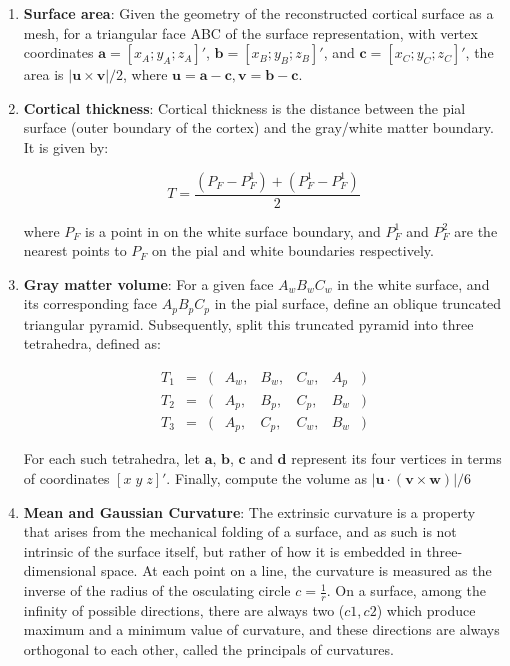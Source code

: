 \documentclass{cys}
\begin{document}
\begin{enumerate}


\item \textbf{Surface area}: Given the geometry of the reconstructed cortical surface as a mesh, for a triangular face ABC of the surface representation, with vertex coordinates $\mathbf{a}=[x_A ; y_A ; z_A]'$, $\mathbf{b}=[x_B ; y_B ; z_B]'$, and $\mathbf{c}=[x_C ; y_C ; z_C]'$, the area is $|\mathbf{u} \times \mathbf{v}|/2$, where $\mathbf{u} = \mathbf{a}-\mathbf{c}, \mathbf{v} = \mathbf{b}-\mathbf{c}$.

\item \textbf{Cortical thickness}: Cortical thickness is the distance between the pial surface (outer boundary of the cortex) and the gray/white matter boundary. It is given by: 

\begin{equation}
T=\frac{(P_F-P_F^1)+(P_F^1-P_F^1)}{2}
\end{equation}

where $P_F$ is a point in on the white surface boundary, and $P_F^1$ and $P_F^2$ are the nearest points to $P_F$ on the pial and white boundaries respectively. 

\item \textbf{Gray matter volume}: For a given face $A_w B_w C_w$ in the white surface, and its corresponding face $A_p B_p C_p$ in the pial surface, define an oblique truncated triangular pyramid. Subsequently, split this truncated pyramid into three tetrahedra, defined as:

\[
\begin{array}{lcllllll} 
T_1 &=& (&A_w,&B_w,&C_w,&A_p&)\\ 
T_2 &=& (&A_p,&B_p,&C_p,&B_w&)\\ 
T_3 &=& (&A_p,&C_p,&C_w,&B_w&)
\end{array}
\]

For each such tetrahedra, let $\mathbf{a}$, $\mathbf{b}$, $\mathbf{c}$ and $\mathbf{d}$ represent its four vertices in terms of coordinates $[x\;y\;z]'$. Finally, compute the volume as $|\mathbf{u}\cdot(\mathbf{v} \times \mathbf{w})|/6$
 
\item \textbf{Mean and Gaussian Curvature}: The extrinsic curvature is a property that arises from the mechanical folding of a surface, and as such is not intrinsic of the surface itself, but rather of how it is embedded in three-dimensional space. At each point on a line, the curvature is measured as the inverse of the radius of the osculating circle $c=\frac{1}{r}$. On a 
surface, among the infinity of possible directions, there are always two ($c1, c2$) which produce maximum and a minimum value of curvature, and these directions are always orthogonal to each other, called the principals of curvatures. 


\end{enumerate}
\end{document}
